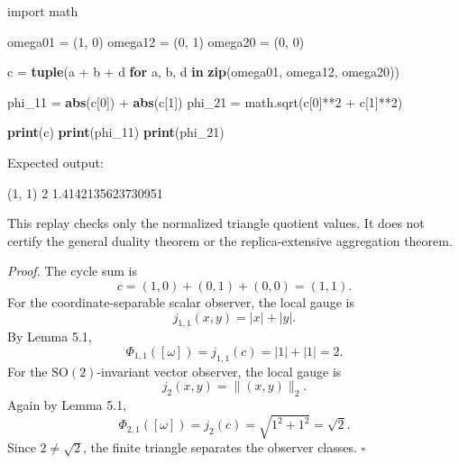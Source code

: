 \documentclass[
  11pt,
]{article}
\newenvironment{Shaded}{\begin{snugshade}}{\end{snugshade}}
\newcommand{\BuiltInTok}[1]{\textcolor[rgb]{0.39,0.29,0.61}{\textbf{#1}}}
\newcommand{\ControlFlowTok}[1]{\textcolor[rgb]{0.12,0.11,0.11}{\textbf{#1}}}
\newcommand{\DecValTok}[1]{\textcolor[rgb]{0.69,0.50,0.00}{#1}}
\newcommand{\ImportTok}[1]{\textcolor[rgb]{1.00,0.33,0.00}{#1}}
\newcommand{\KeywordTok}[1]{\textcolor[rgb]{0.12,0.11,0.11}{\textbf{#1}}}
\newcommand{\NormalTok}[1]{\textcolor[rgb]{0.12,0.11,0.11}{#1}}
\newcommand{\OperatorTok}[1]{\textcolor[rgb]{0.12,0.11,0.11}{#1}}
\begin{document}
\begin{Shaded}
\begin{Highlighting}[]
\ImportTok{import}\NormalTok{ math}

\NormalTok{omega01 }\OperatorTok{=}\NormalTok{ (}\DecValTok{1}\NormalTok{, }\DecValTok{0}\NormalTok{)}
\NormalTok{omega12 }\OperatorTok{=}\NormalTok{ (}\DecValTok{0}\NormalTok{, }\DecValTok{1}\NormalTok{)}
\NormalTok{omega20 }\OperatorTok{=}\NormalTok{ (}\DecValTok{0}\NormalTok{, }\DecValTok{0}\NormalTok{)}

\NormalTok{c }\OperatorTok{=} \BuiltInTok{tuple}\NormalTok{(a }\OperatorTok{+}\NormalTok{ b }\OperatorTok{+}\NormalTok{ d }\ControlFlowTok{for}\NormalTok{ a, b, d }\KeywordTok{in} \BuiltInTok{zip}\NormalTok{(omega01, omega12, omega20))}

\NormalTok{phi\_11 }\OperatorTok{=} \BuiltInTok{abs}\NormalTok{(c[}\DecValTok{0}\NormalTok{]) }\OperatorTok{+} \BuiltInTok{abs}\NormalTok{(c[}\DecValTok{1}\NormalTok{])}
\NormalTok{phi\_21 }\OperatorTok{=}\NormalTok{ math.sqrt(c[}\DecValTok{0}\NormalTok{]}\OperatorTok{**}\DecValTok{2} \OperatorTok{+}\NormalTok{ c[}\DecValTok{1}\NormalTok{]}\OperatorTok{**}\DecValTok{2}\NormalTok{)}

\BuiltInTok{print}\NormalTok{(c)}
\BuiltInTok{print}\NormalTok{(phi\_11)}
\BuiltInTok{print}\NormalTok{(phi\_21)}
\end{Highlighting}
\end{Shaded}

Expected output:

\begin{Shaded}
\begin{Highlighting}[]
\NormalTok{(1, 1)}
\NormalTok{2}
\NormalTok{1.4142135623730951}
\end{Highlighting}
\end{Shaded}

This replay checks only the normalized triangle quotient values. It does
not certify the general duality theorem or the replica-extensive
aggregation theorem.

\emph{Proof.} The cycle sum is \[
c=(1,0)+(0,1)+(0,0)=(1,1).
\] For the coordinate-separable scalar observer, the local gauge is \[
j_{1,1}(x,y)=|x|+|y|.
\] By Lemma 5.1, \[
\Phi_{1,1}([\omega])=j_{1,1}(c)=|1|+|1|=2.
\] For the \(\mathrm{SO}(2)\)-invariant vector observer, the local gauge
is \[
j_{2}(x,y)=\|(x,y)\|_2.
\] Again by Lemma 5.1, \[
\Phi_{2,1}([\omega])=j_2(c)=\sqrt{1^2+1^2}=\sqrt2.
\] Since \(2\ne\sqrt2\), the finite triangle separates the observer
classes. \(\square\)
\end{document}
